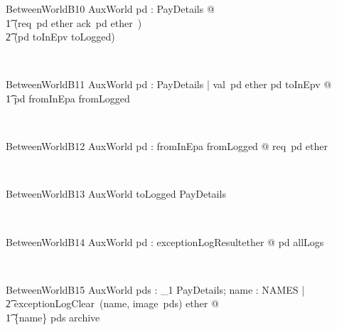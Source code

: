 \begin{LNewSDef}
\begin{schema}{BetweenWorldB10}
   AuxWorld
\where
\forall pd : PayDetails @
  \\ %
  \t1 (req~pd \in ether \land ack~pd \notin ether~)
  \\ %
  \t2 \iff (pd \in toInEpv \cup toLogged)
\end{schema}~\end{LNewSDef}

\begin{LNewSDef}
\begin{schema}{BetweenWorldB11}
   AuxWorld
\where
\forall pd : PayDetails | val~pd \in ether \land pd \in toInEpv @
  \\ %
  \t1 pd \in fromInEpa \cup fromLogged
\end{schema}~\end{LNewSDef}

\begin{LNewSDef}
\begin{schema}{BetweenWorldB12}
   AuxWorld
\where
\forall pd : fromInEpa \cup fromLogged @  req~pd \in ether
\end{schema}~\end{LNewSDef}

\begin{LNewSDef}
\begin{schema}{BetweenWorldB13}
   AuxWorld
\where
toLogged \in \finset PayDetails
\end{schema}~\end{LNewSDef}

\begin{LNewSDef}
\begin{schema}{BetweenWorldB14}
   AuxWorld
\where
\forall pd : exceptionLogResult\inv \limg ether \rimg @ pd \in
  allLogs
\end{schema}~\end{LNewSDef}

\begin{LNewSDef}
\begin{schema}{BetweenWorldB15}
   AuxWorld
\where
\forall pds : \power_1 PayDetails; name : NAMES |
  \\ %
  \t2 exceptionLogClear~(name, image~pds) \in ether @
  \\ %
  \t1 \{name\} \cross pds \subseteq archive
\end{schema}~\end{LNewSDef}

